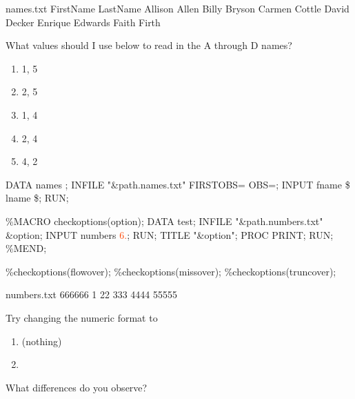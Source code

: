 \begin{frame}[fragile]
\begin{craw}{.0}{names.txt}
FirstName LastName
Allison Allen
Billy Bryson
Carmen Cottle
David Decker
Enrique Edwards
Faith Firth
\end{craw}
\emp
{} \hspace{0.05in} \emp
{}
\begin{clicker}{What values should I use below to read in the A through D names?}
\begin{enumerate}
\item 1, 5
\item 2, 5
\item 1, 4
\item 2, 4
\item 4, 2
\end{enumerate}
\end{clicker}
\emp

\begin{code}{.0}
DATA names ;
  INFILE "\&path.names.txt" FIRSTOBS=\fbox{\textcolor{White}{2}} OBS=\fbox{\textcolor{White}{5}};
  INPUT fname \$ lname \$;
RUN;
\end{code}
\emp



\end{frame}


\begin{frame}[fragile]
\footnotesize
\begin{code}{.0}
\%MACRO checkoptions(option);
DATA test;
   INFILE "\&path.numbers.txt" \&option;
   INPUT numbers \textcolor{OrangeRed}{6.};
RUN;
TITLE "\&option";
PROC PRINT; RUN;
\%MEND;

\%checkoptions(flowover);
\%checkoptions(missover);
\%checkoptions(truncover);
\end{code}
\emp
{} \hspace{0.05in} \emp
{}
\begin{craw}{.0}{numbers.txt}
666666
1
22
333
4444
55555
\end{craw}
\vskip3pt
\oyo Try changing the \fbox{\ttt{\textcolor{OrangeRed}{6.}}} numeric format to
\begin{enumerate}
\item \fbox{\ttt{\textcolor{White}{.6}}} (nothing)
\item {}
\end{enumerate}
What differences do you observe?
\emp
\end{frame}

